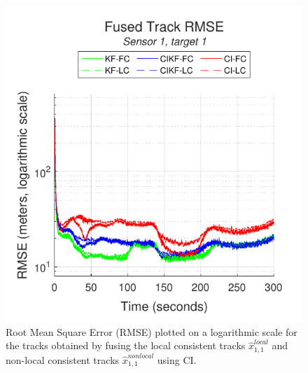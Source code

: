 \documentclass[journal]{IEEEtran}
\begin{document}
\begin{figure}[ht]
    \centering
    \includegraphics[scale=0.85]{fusedtrack_rmse_s1t1.pdf}
    \caption{Root Mean Square Error (RMSE) plotted on a logarithmic scale for the tracks obtained by fusing the local consistent tracks $\hat{x}_{1,1}^{local}$ and non-local consistent tracks $\hat{x}_{1,1}^{nonlocal}$ using CI.}
    \label{fig:resultsfusedtrackrmses1t1}
\end{figure}
\end{document}
